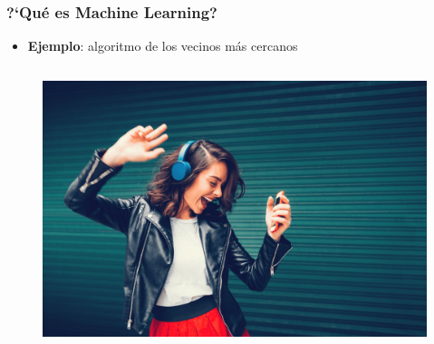 \documentclass[10pt]{beamer}
\begin{document}
\begin{frame}
\frametitle{?`Qu\'e es Machine Learning?}

\begin{beamerboxesrounded}[upper=uppercolor, lower=lowercolor, shadow=true]{} 

\begin{itemize}
 \item \textbf{Ejemplo}: algoritmo de los vecinos m\'as cercanos
 
\end{itemize}
\end{beamerboxesrounded}

\begin{columns}

\hspace{-7mm}
\begin{column}{.3\textwidth}
\vspace{-3mm}
 \begin{figure}
 \includegraphics[scale=0.07]{./Figures/music.png} 
 \end{figure}
\end{column}%


\end{columns}
\end{frame}
\end{document}
